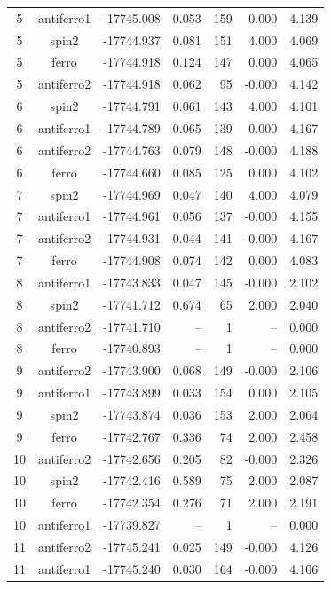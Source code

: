 \begin{longtable}{@{}ccrrrrr@{}}
\rowcolor{gray!20} 5 & antiferro1 & -17745.008 & 0.053 & 159 & 0.000 & 4.139 \\
5 & spin2 & -17744.937 & 0.081 & 151 & 4.000 & 4.069 \\
5 & ferro & -17744.918 & 0.124 & 147 & 0.000 & 4.065 \\
5 & antiferro2 & -17744.918 & 0.062 & 95 & -0.000 & 4.142 \\
\rowcolor{gray!20} 6 & spin2 & -17744.791 & 0.061 & 143 & 4.000 & 4.101 \\
6 & antiferro1 & -17744.789 & 0.065 & 139 & 0.000 & 4.167 \\
6 & antiferro2 & -17744.763 & 0.079 & 148 & -0.000 & 4.188 \\
6 & ferro & -17744.660 & 0.085 & 125 & 0.000 & 4.102 \\
\rowcolor{gray!20} 7 & spin2 & -17744.969 & 0.047 & 140 & 4.000 & 4.079 \\
7 & antiferro1 & -17744.961 & 0.056 & 137 & -0.000 & 4.155 \\
7 & antiferro2 & -17744.931 & 0.044 & 141 & -0.000 & 4.167 \\
7 & ferro & -17744.908 & 0.074 & 142 & 0.000 & 4.083 \\
\rowcolor{gray!20} 8 & antiferro1 & -17743.833 & 0.047 & 145 & -0.000 & 2.102 \\
8 & spin2 & -17741.712 & 0.674 & 65 & 2.000 & 2.040 \\
8 & antiferro2 & -17741.710 & -- & 1 & -- & 0.000 \\
8 & ferro & -17740.893 & -- & 1 & -- & 0.000 \\
\rowcolor{gray!20} 9 & antiferro2 & -17743.900 & 0.068 & 149 & -0.000 & 2.106 \\
9 & antiferro1 & -17743.899 & 0.033 & 154 & 0.000 & 2.105 \\
9 & spin2 & -17743.874 & 0.036 & 153 & 2.000 & 2.064 \\
9 & ferro & -17742.767 & 0.336 & 74 & 2.000 & 2.458 \\
\rowcolor{gray!20} 10 & antiferro2 & -17742.656 & 0.205 & 82 & -0.000 & 2.326 \\
10 & spin2 & -17742.416 & 0.589 & 75 & 2.000 & 2.087 \\
10 & ferro & -17742.354 & 0.276 & 71 & 2.000 & 2.191 \\
10 & antiferro1 & -17739.827 & -- & 1 & -- & 0.000 \\
\rowcolor{gray!20} 11 & antiferro2 & -17745.241 & 0.025 & 149 & -0.000 & 4.126 \\
11 & antiferro1 & -17745.240 & 0.030 & 164 & -0.000 & 4.106 \\

\end{longtable}
